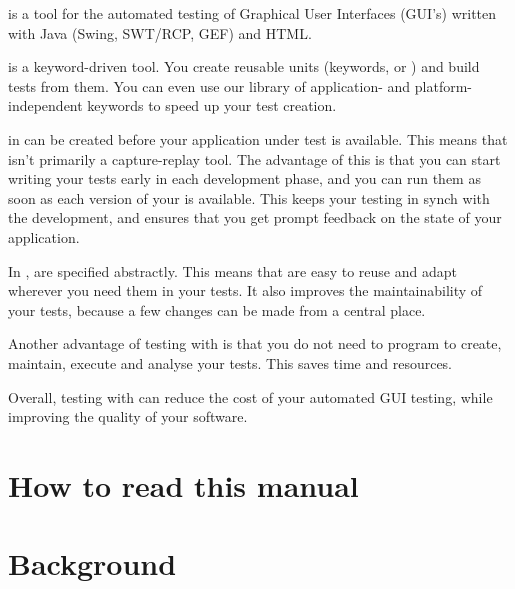 
\GD is a tool for the automated testing of 
Graphical User Interfaces (GUI's) written with Java (Swing, SWT/RCP, GEF) and HTML. 
 
\gd{} is a keyword-driven tool. You create reusable units (keywords, or \gdcases{}) and build tests from them. You can even use our library of application- and platform-independent keywords to speed up your test creation.

\gdcases{} in \gd{} can be created before your application under test \gdaut{} is available. This means that \gd{} isn't primarily a capture-replay tool. The advantage of this is that you can start writing your tests early in each development phase, and you can run them as soon as each version of your \gdaut{} is available. This keeps your testing in synch with the development, and ensures that you get prompt feedback on the state of your application. 

In \gd{}, \gdcases{} are specified abstractly. This means that \gdcases{} are easy to reuse and adapt wherever you need them in your tests. It also improves the maintainability of your tests, because a few changes can be made from a central place. 

Another advantage of testing with \gd{} is that you do not need to program to create, maintain, execute and analyse your tests. This saves time and resources.  

Overall, testing with \gd{} can reduce the cost of your automated GUI testing, while improving the quality of your software. 

\section{How to read this manual}

\clearpage
\section{Background}

\clearpage


